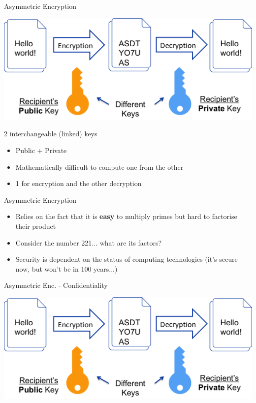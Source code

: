 \documentclass[aspectratio=169]{beamer}
\begin{document}
\begin{frame}{Asymmetric Encryption}
\begin{center}
	\includegraphics[width=0.45\linewidth]{asymmetric-encryption.png}
\end{center}
2 interchangeable (linked) keys
\begin{itemize}
  \item Public + Private 
  \item Mathematically difficult to compute one from the other 
  \item 1 for encryption and the other decryption
\end{itemize} 
\end{frame}

\begin{frame}{{\color{red}Asymmetric Encryption}}
\begin{itemize}
\item Relies on the fact that it is \textbf{easy} to multiply primes but hard to factorise their product
\item Consider the number 221... what are its factors?
\item Security is dependent on the status of computing technologies (it's secure now, but won't be in 100 years...)
\end{itemize}
\end{frame}

\begin{frame}{{\color{red}Asymmetric Enc. - Confidentiality}}
\begin{center}
\includegraphics[width=0.9\linewidth]{asymmetric-encryption.png}
\end{center}
\end{frame}
\end{document}
